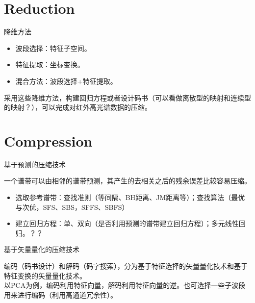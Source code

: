 \documentclass[aspectratio=43]{beamer}
\begin{document}
\section{Reduction}
\begin{frame}{降维方法}
\begin{itemize}
\item 波段选择：特征子空间。
\item 特征提取：坐标变换。
\item 混合方法：波段选择+特征提取。
\end{itemize}
\begin{card}
采用这些降维方法，构建回归方程或者设计码书（{\color{green}可以看做离散型的映射和连续型的映射？}），可以完成对红外高光谱数据的压缩。
\end{card}
\end{frame}

\section{Compression}
\begin{frame}{基于预测的压缩技术}
\begin{card}
一个谱带可以由相邻的谱带预测，其产生的去相关之后的残余误差比较容易压缩。
\end{card}
\begin{card}[步骤]
\begin{itemize}
\item 选取参考谱带：查找准则（等间隔、BH距离、JM距离等）；查找算法（最优与次优，SFS、SBS，SFFS、SBFS）
\item 建立回归方程：单、双向（是否利用预测的谱带建立回归方程）；多元线性回归。{\color{green}？？}
\end{itemize}
\end{card}
\end{frame}

\begin{frame}{基于矢量量化的压缩技术}
\begin{card}[Idea]
{\color{primary}编码}（码书设计）和{\color{primary}解码}（码字搜索），分为{\color{primary}基于特征选择}的矢量量化技术和{\color{primary}基于特征变换}的矢量量化技术。\\  [2mm]
以PCA为例，编码利用特征向量，解码利用特征向量的逆。也可选择一些子波段用来进行编码（利用高通道冗余性）\cite{Pellet2016Dimension}。
\end{card}
%
\end{frame}
\end{document}
